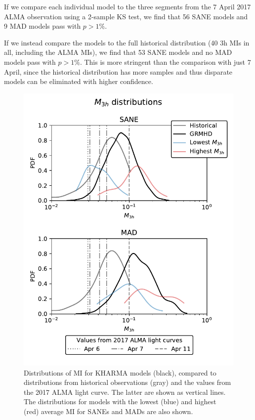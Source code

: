 If we compare each individual model to the three segments from the 7 April 2017 ALMA observation using a 2-sample KS test, we find that 56 SANE models and 9 MAD models pass with $p > 1\%$. 

If we instead compare the models to the full historical distribution (40 3h MIs in all, including the ALMA MIs), we find that 53 SANE models and no MAD models pass with $p > 1\%$. This is more stringent than the comparison with just 7 April, since the historical distribution has more samples and thus disparate models can be eliminated with higher confidence. 


\begin{figure}
  \centering
  \includegraphics[width=\columnwidth]{./figures/mi_dist.pdf}
  \caption{Distributions of MI for KHARMA models (black), compared to distributions from historical observations (gray) and the values from the 2017 ALMA light curve. The latter are shown as vertical lines. The distributions for models with the lowest (blue) and highest (red) average MI for SANEs and MADs are also shown. 
}
\end{figure}
